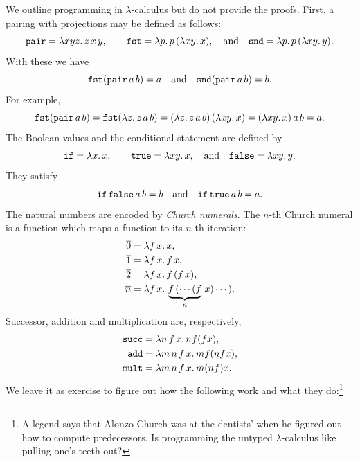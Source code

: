 We outline programming in $\lambda$-calculus but do not provide the
proofs. First, a pairing with projections may be defined as follows:
%
\begin{equation*}
  \mathtt{pair} = \lambda x y z .\,z\, x\, y,
  \qquad
  \mathtt{fst} = \lambda p .\,p \, (\lambda x y .\,x),
  \quad\text{and}\quad
  \mathtt{snd} = \lambda p .\,p \, (\lambda x y .\,y).
\end{equation*}
%
With these we have
%
\begin{equation*}
  \mathtt{fst} (\mathtt{pair}\, a\, b) = a
  \quad\text{and}\quad
  \mathtt{snd} (\mathtt{pair}\, a\, b) = b.
\end{equation*}
%
For example,
%
\begin{equation*}
  \mathtt{fst} (\mathtt{pair}\, a\, b) =
  \mathtt{fst} (\lambda z .\,z\, a\, b) =
  (\lambda z .\,z\, a\, b) \, (\lambda x y .\,x) =
  (\lambda x y .\,x) \, a \, b = a.
\end{equation*}
%
The Boolean values and the conditional statement are defined by
%
\begin{equation*}
  \mathtt{if} = \lambda x .\,x,
  \qquad
  \mathtt{true} = \lambda x y .\,x,
  \quad\text{and}\quad
  \mathtt{false} = \lambda x y .\,y.
\end{equation*}
%
They satisfy
%
\begin{equation*}
  \mathtt{if}\,\mathtt{false}\,a\,b = b
  \quad\text{and}\quad
  \mathtt{if}\,\mathtt{true}\,a\,b = a.
\end{equation*}
%
The natural numbers are encoded by \emph{Church numerals}. The $n$-th
Church numeral is a function which maps a function to its $n$-th
iteration:
%
\begin{align*}
  \overline{0} &= \lambda f\,x .\,x,\\
  \overline{1} &= \lambda f\,x .\,f\,x,\\
  \overline{2} &= \lambda f\,x .\,f\,(f\,x),\\
  \overline{n} &= \lambda f\,x .\,\underbrace{f\,(\cdots (f}_n\,x) \cdots).
\end{align*}
%
Successor, addition and multiplication are, respectively,
%
\begin{align*}
  \mathtt{succ} &= \lambda n\,f\,x .\,n f (f x),\\
  \mathtt{add} &= \lambda m\,n\,f\,x .\,m f (n f x),\\
  \mathtt{mult} &= \lambda m\,n\,f\,x .\,m (n f) x.
\end{align*}
%
We leave it as exercise to figure out how the following work and what
they do:\footnote{A legend says that Alonzo Church was at the
  dentists' when he figured out how to compute predecessors. Is
  programming the untyped $\lambda$-calculus like pulling one's teeth
  out?}

